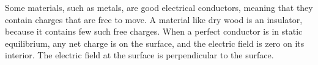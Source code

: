 Some materials, such as metals, are good electrical conductors, meaning
that they contain charges that are free to move. A material like dry wood
is an insulator, because it contains few such free charges. When a perfect
conductor is in static equilibrium, any net charge is on the surface, and
the electric field is zero on its interior. The electric field at the surface
is perpendicular to the surface.
